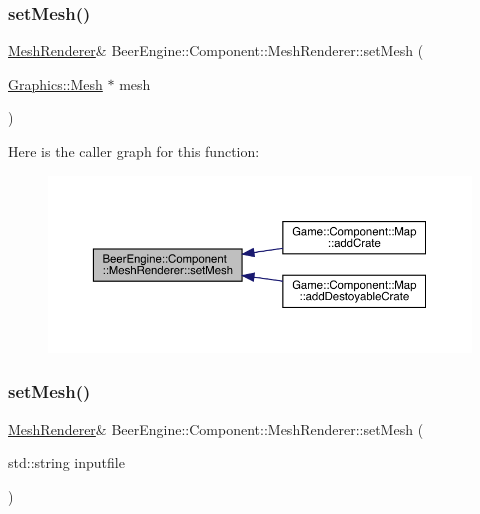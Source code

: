 \subsubsection{\texorpdfstring{set\+Mesh()}{setMesh()}\hspace{0.1cm}{\footnotesize\ttfamily [1/2]}}
{\footnotesize\ttfamily \mbox{\hyperlink{class_beer_engine_1_1_component_1_1_mesh_renderer}{Mesh\+Renderer}}\& Beer\+Engine\+::\+Component\+::\+Mesh\+Renderer\+::set\+Mesh (\begin{DoxyParamCaption}\item[{\mbox{\hyperlink{class_beer_engine_1_1_graphics_1_1_mesh}{Graphics\+::\+Mesh}} $\ast$}]{mesh }\end{DoxyParamCaption})}

Here is the caller graph for this function\+:\nopagebreak
\begin{figure}[H]
\begin{center}
\leavevmode
\includegraphics[width=350pt]{class_beer_engine_1_1_component_1_1_mesh_renderer_a818276a7fe8703a04bf431a41fa4c907_icgraph}
\end{center}
\end{figure}
\mbox{\label{class_beer_engine_1_1_component_1_1_mesh_renderer_a0bc2f51937864cfb8a470cd9a19321e6}} 
\subsubsection{\texorpdfstring{set\+Mesh()}{setMesh()}\hspace{0.1cm}{\footnotesize\ttfamily [2/2]}}
{\footnotesize\ttfamily \mbox{\hyperlink{class_beer_engine_1_1_component_1_1_mesh_renderer}{Mesh\+Renderer}}\& Beer\+Engine\+::\+Component\+::\+Mesh\+Renderer\+::set\+Mesh (\begin{DoxyParamCaption}\item[{std\+::string}]{inputfile }\end{DoxyParamCaption})}



